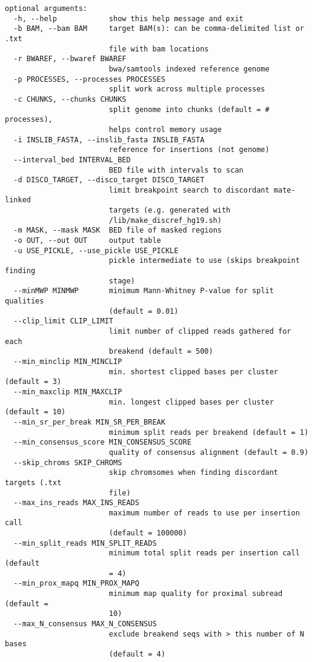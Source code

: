 \documentclass[letterpaper,11pt]{article}
\begin{document}
\begin{verbatim}
optional arguments:
  -h, --help            show this help message and exit
  -b BAM, --bam BAM     target BAM(s): can be comma-delimited list or .txt
                        file with bam locations
  -r BWAREF, --bwaref BWAREF
                        bwa/samtools indexed reference genome
  -p PROCESSES, --processes PROCESSES
                        split work across multiple processes
  -c CHUNKS, --chunks CHUNKS
                        split genome into chunks (default = # processes),
                        helps control memory usage
  -i INSLIB_FASTA, --inslib_fasta INSLIB_FASTA
                        reference for insertions (not genome)
  --interval_bed INTERVAL_BED
                        BED file with intervals to scan
  -d DISCO_TARGET, --disco_target DISCO_TARGET
                        limit breakpoint search to discordant mate-linked
                        targets (e.g. generated with
                        /lib/make_discref_hg19.sh)
  -m MASK, --mask MASK  BED file of masked regions
  -o OUT, --out OUT     output table
  -u USE_PICKLE, --use_pickle USE_PICKLE
                        pickle intermediate to use (skips breakpoint finding
                        stage)
  --minMWP MINMWP       minimum Mann-Whitney P-value for split qualities
                        (default = 0.01)
  --clip_limit CLIP_LIMIT
                        limit number of clipped reads gathered for each
                        breakend (default = 500)
  --min_minclip MIN_MINCLIP
                        min. shortest clipped bases per cluster (default = 3)
  --min_maxclip MIN_MAXCLIP
                        min. longest clipped bases per cluster (default = 10)
  --min_sr_per_break MIN_SR_PER_BREAK
                        minimum split reads per breakend (default = 1)
  --min_consensus_score MIN_CONSENSUS_SCORE
                        quality of consensus alignment (default = 0.9)
  --skip_chroms SKIP_CHROMS
                        skip chromsomes when finding discordant targets (.txt
                        file)
  --max_ins_reads MAX_INS_READS
                        maximum number of reads to use per insertion call
                        (default = 100000)
  --min_split_reads MIN_SPLIT_READS
                        minimum total split reads per insertion call (default
                        = 4)
  --min_prox_mapq MIN_PROX_MAPQ
                        minimum map quality for proximal subread (default =
                        10)
  --max_N_consensus MAX_N_CONSENSUS
                        exclude breakend seqs with > this number of N bases
                        (default = 4)

\end{verbatim}
\end{document}
